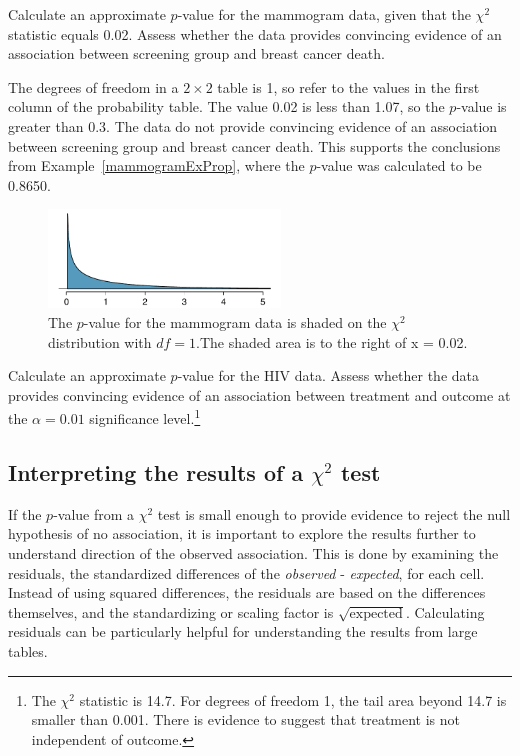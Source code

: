 \begin{example}{Calculate an approximate $p$-value for the mammogram data, given that the $\chi^2$ statistic equals 0.02. Assess whether the data provides convincing evidence of an association between screening group and breast cancer death.}

The degrees of freedom in a $2 \times 2$ table is 1, so refer to the values in the first column of the probability table. The value 0.02 is less than 1.07, so the $p$-value is greater than 0.3. The data do not provide convincing evidence of an association between screening group and breast cancer death. This supports the conclusions from Example~\ref{mammogramExProp}, where the $p$-value was calculated to be 0.8650.

\begin{figure}[h]
	\centering
	\includegraphics[width=0.55\textwidth]{ch_inference_for_props_oi_biostat/figures/mammogramPValue/mammogramPValue}
	\caption{The $p$-value for the mammogram data is shaded on the $\chi^2$ distribution with $df=1$.The shaded area is to the right of x = 0.02.}
	\label{mammogramPValue}
\end{figure}

\end{example}

\begin{exercise} Calculate an approximate $p$-value for the HIV data. Assess whether the data provides convincing evidence of an association between treatment and outcome at the $\alpha = 0.01$ significance level.\footnote{The $\chi^2$ statistic is 14.7. For degrees of freedom 1, the tail area beyond 14.7 is smaller than 0.001. There is evidence to suggest that treatment is not independent of outcome.}
\label{hivDataPValue}	
\end{exercise}

\subsection{Interpreting the results of a $\chi^2$ test}

If the $p$-value from a $\chi^2$ test is small enough to provide evidence to reject the null hypothesis of no association, it is important to explore the results further to understand direction of the observed association. This is done by examining the residuals, the standardized differences of the \emph{observed} - \emph{expected}, for each cell. Instead of using squared differences, the residuals are based on the differences themselves, and the standardizing or scaling factor is $\sqrt{\text{expected}}$.  Calculating residuals can be particularly helpful for understanding the results from large tables.


